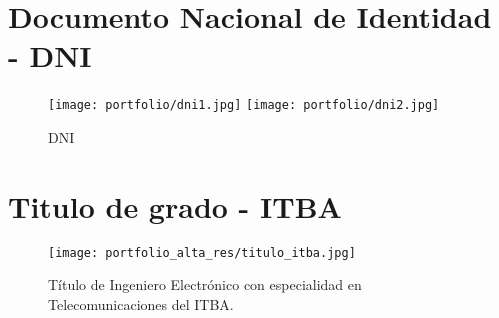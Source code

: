\break
\section{Documento Nacional de Identidad - DNI}
   \begin{figure}
      \begin{center}
         \texttt{[image: portfolio/dni1.jpg]}
         \texttt{[image: portfolio/dni2.jpg]}
      \end{center}
      \caption{DNI}
      \label{fig:dni}
   \end{figure}

\newpage
\mbox{}
\newpage %

\section{Titulo de grado - ITBA}
   \begin{figure}
      \begin{center}
         \texttt{[image: portfolio\_alta\_res/titulo\_itba.jpg]}
      \end{center}
      \caption{Título de Ingeniero Electrónico con especialidad en Telecomunicaciones del ITBA.}
      \label{fig:titulo_itba}
   \end{figure}

